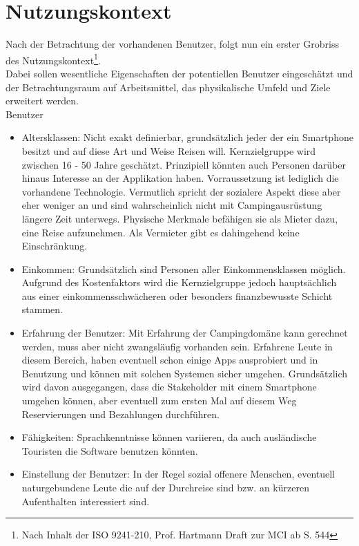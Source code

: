 
\section{Nutzungskontext}
Nach der Betrachtung der vorhandenen Benutzer, folgt nun ein erster Grobriss des Nutzungskontext\footnote{Nach Inhalt der ISO 9241-210, Prof. Hartmann Draft zur MCI ab S. 544}.\\
Dabei sollen wesentliche Eigenschaften der potentiellen Benutzer eingeschätzt und der Betrachtungsraum auf Arbeitsmittel, das physikalische Umfeld und Ziele erweitert werden.\\


Benutzer
\begin{itemize}
   \item 
   Altersklassen: Nicht exakt definierbar, grundsätzlich jeder der ein Smartphone besitzt und auf diese Art und Weise Reisen will. Kernzielgruppe wird zwischen 16 - 50 Jahre geschätzt. Prinzipiell könnten auch Personen darüber hinaus Interesse an der Applikation haben. Vorraussetzung ist lediglich die vorhandene Technologie. Vermutlich spricht der sozialere Aspekt diese aber eher weniger an und sind wahrscheinlich nicht mit Campingausrüstung längere Zeit unterwegs. Physische Merkmale befähigen sie als Mieter dazu, eine Reise aufzunehmen. Als Vermieter gibt es dahingehend keine Einschränkung.

   \item 
   Einkommen: Grundsätzlich sind Personen aller Einkommensklassen möglich. Aufgrund des Kostenfaktors wird die Kernzielgruppe jedoch hauptsächlich aus einer einkommensschwächeren oder besonders finanzbewusste Schicht stammen.

   \item 
   Erfahrung der Benutzer: Mit Erfahrung der Campingdomäne kann gerechnet werden, muss aber nicht zwangsläufig vorhanden sein.
   Erfahrene Leute in diesem Bereich, haben eventuell schon einige Apps ausprobiert und in Benutzung und können mit solchen Systemen sicher umgehen.
   Grundsätzlich wird davon ausgegangen, dass die Stakeholder mit einem Smartphone umgehen können, aber eventuell zum ersten Mal auf diesem Weg Reservierungen und Bezahlungen durchführen. 

   \item
   Fähigkeiten: Sprachkenntnisse können variieren, da auch ausländische Touristen die Software benutzen könnten.

   \item 
   Einstellung der Benutzer: In der Regel sozial offenere Menschen, eventuell naturgebundene Leute die auf der Durchreise sind bzw. an kürzeren Aufenthalten interessiert sind. 

   
\end{itemize}

